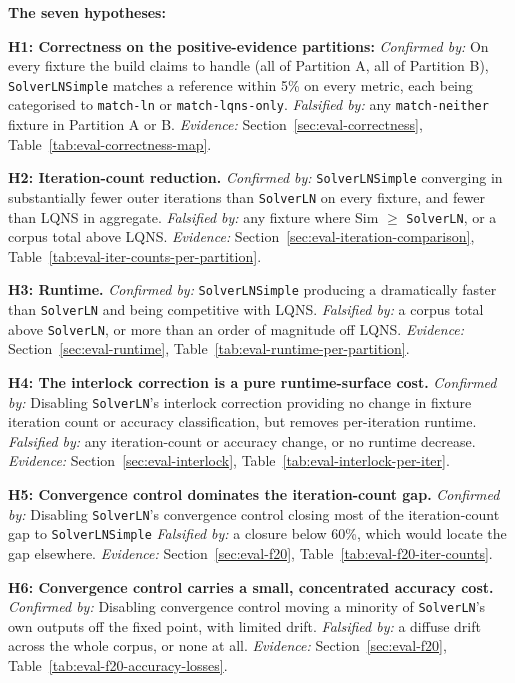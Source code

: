 \textbf{The seven hypotheses:}

\textbf{H1: Correctness on the positive-evidence partitions:} \textit{Confirmed by:} On every fixture the build claims to handle (all of Partition A, all of Partition B), \texttt{SolverLNSimple} matches a reference within 5\% on every metric, each being categorised to \texttt{match-ln} or \texttt{match-lqns-only}. \textit{Falsified by:} any \texttt{match-neither} fixture in Partition A or B. \textit{Evidence:} Section~\ref{sec:eval-correctness}, Table~\ref{tab:eval-correctness-map}.

\textbf{H2: Iteration-count reduction.} \textit{Confirmed by:} \texttt{SolverLNSimple} converging in substantially fewer outer iterations than \texttt{SolverLN} on every fixture, and fewer than LQNS in aggregate. \textit{Falsified by:} any fixture where Sim $\geq$ \texttt{SolverLN}, or a corpus total above LQNS. \textit{Evidence:} Section~\ref{sec:eval-iteration-comparison}, Table~\ref{tab:eval-iter-counts-per-partition}.

\textbf{H3: Runtime.} \textit{Confirmed by:} \texttt{SolverLNSimple} producing a dramatically faster than \texttt{SolverLN} and being competitive with LQNS. \textit{Falsified by:} a corpus total above \texttt{SolverLN}, or more than an order of magnitude off LQNS. \textit{Evidence:} Section~\ref{sec:eval-runtime}, Table~\ref{tab:eval-runtime-per-partition}.

\textbf{H4: The interlock correction is a pure runtime-surface cost.} \textit{Confirmed by:} Disabling \texttt{SolverLN}'s interlock correction providing no change in fixture iteration count or accuracy classification, but removes per-iteration runtime. \textit{Falsified by:} any iteration-count or accuracy change, or no runtime decrease. \textit{Evidence:} Section~\ref{sec:eval-interlock}, Table~\ref{tab:eval-interlock-per-iter}.

\textbf{H5: Convergence control dominates the iteration-count gap.} \textit{Confirmed by:} Disabling \texttt{SolverLN}'s convergence control closing most of the iteration-count gap to \texttt{SolverLNSimple} \textit{Falsified by:} a closure below 60\%, which would locate the gap elsewhere. \textit{Evidence:} Section~\ref{sec:eval-f20}, Table~\ref{tab:eval-f20-iter-counts}.

\textbf{H6: Convergence control carries a small, concentrated accuracy cost.} \textit{Confirmed by:} Disabling convergence control moving a minority of \texttt{SolverLN}'s own outputs off the fixed point, with limited drift. \textit{Falsified by:} a diffuse drift across the whole corpus, or none at all. \textit{Evidence:} Section~\ref{sec:eval-f20}, Table~\ref{tab:eval-f20-accuracy-losses}.

